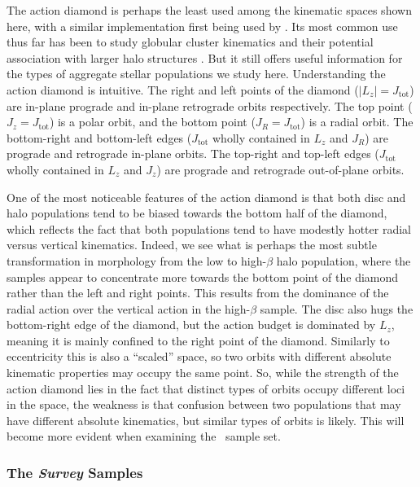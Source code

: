 The action diamond is perhaps the least used among the kinematic spaces shown here, with a similar implementation first being used by \textcite{vasiliev19} \parencite[to our knowledge, although they recognize that the space is analogous to visualisations of three-dimensional action spaces presented by][]{binney08}. Its most common use thus far has been to study globular cluster kinematics and their potential association with larger halo structures \parencite{vasiliev19,myeong19}. But it still offers useful information for the types of aggregate stellar populations we study here. Understanding the action diamond is intuitive. The right and left points of the diamond ($\lvert L_{z} \rvert =J_\mathrm{tot}$) are in-plane prograde and in-plane retrograde orbits respectively. The top point ($J_{z}=J_\mathrm{tot}$) is a polar orbit, and the bottom point ($J_{R}=J_\mathrm{tot}$) is a radial orbit. The bottom-right and bottom-left edges ($J_\mathrm{tot}$ wholly contained in $L_{z}$ and $J_{R}$) are prograde and retrograde in-plane orbits. The top-right and top-left edges ($J_\mathrm{tot}$ wholly contained in $L_{z}$ and $J_{z}$) are prograde and retrograde out-of-plane orbits.

One of the most noticeable features of the action diamond is that both disc and halo populations tend to be biased towards the bottom half of the diamond, which reflects the fact that both populations tend to have modestly hotter radial versus vertical kinematics. Indeed, we see what is perhaps the most subtle transformation in morphology from the low to high-$\beta$ halo population, where the samples appear to concentrate more towards the bottom point of the diamond rather than the left and right points. This results from the dominance of the radial action over the vertical action in the high-$\beta$ sample. The disc also hugs the bottom-right edge of the diamond, but the action budget is dominated by $L_{z}$, meaning it is mainly confined to the right point of the diamond. Similarly to eccentricity this is also a ``scaled'' space, so two orbits with different absolute kinematic properties may occupy the same point. So, while the strength of the action diamond lies in the fact that distinct types of orbits occupy different loci in the space, the weakness is that confusion between two populations that may have different absolute kinematics, but similar types of orbits is likely. This will become more evident when examining the \survey\ sample set.

\subsubsection{The \textit{Survey} Samples}

